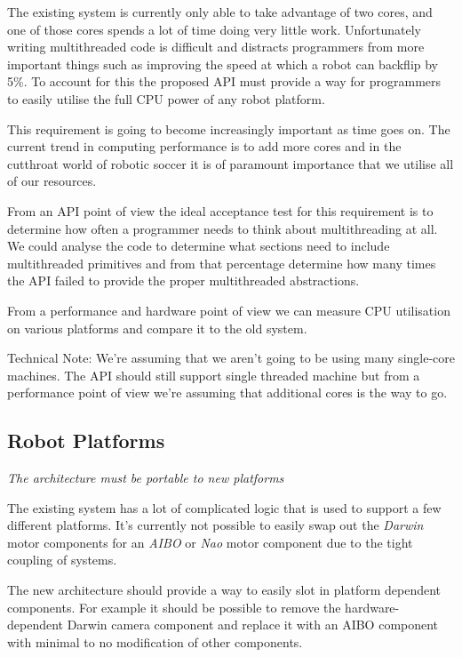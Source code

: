 \documentclass[english,12pt]{scrartcl}
\newcommand{\requirement}[1]{\textit{#1}}
\begin{document}
			The existing system is currently only able to take advantage of two cores, and one of
			those cores spends a lot of time doing very little work. Unfortunately writing
			multithreaded code is difficult and distracts programmers from more important things
			such as improving the speed at which a robot can backflip by 5\%. To account for this
			the proposed API must provide a way for programmers to easily utilise the full CPU power
			of any robot platform.

			This requirement is going to become increasingly important as time goes on. The current
			trend in computing performance is to add more cores and in the cutthroat world of
			robotic soccer it is of paramount importance that we utilise all of our resources.

			From an API point of view the ideal acceptance test for this requirement is to determine
			how often a programmer needs to think about multithreading at all. We could analyse the
			code to determine what sections need to include multithreaded primitives and from that
			percentage determine how many times the API failed to provide the proper multithreaded
			abstractions.

			From a performance and hardware point of view we can measure CPU utilisation on various
			platforms and compare it to the old system.

			Technical Note: We're assuming that we aren't going to be using many single-core
			machines. The API should still support single threaded machine but from a performance
			point of view we're assuming that additional cores is the way to go.

		\subsection{Robot Platforms}
			\requirement{The architecture must be portable to new platforms}

			The existing system has a lot of complicated logic that is used to support a few
			different platforms. It's currently not possible to easily swap out the \emph{Darwin} motor
			components for an \emph{AIBO} or \emph{Nao} motor component due to the tight coupling of systems.

			The new architecture should provide a way to easily slot in platform dependent
			components. For example it should be possible to remove the hardware-dependent Darwin
			camera component and replace it with an AIBO component with minimal to no modification
			of other components.
\end{document}
